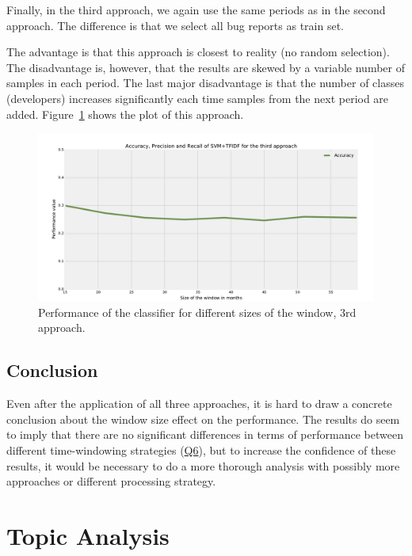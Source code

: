 Finally, in the third approach, we again use the same periods as in the second approach. The difference is that we select all bug reports as train set.

The advantage is that this approach is closest to reality (no random selection). The disadvantage is, however, that the results are skewed by a variable number of samples in each period. The last major disadvantage is that the number of classes (developers) increases significantly each time samples from the next period are added. Figure~\ref{fig:window.firefox.3a} shows the plot of this approach.

\begin{figure}[htbp]
    \centering
        \includegraphics[width=\textwidth]{./images/window_size/firefox_3a.pdf}
    \caption{Performance of the classifier for different sizes of the window, 3rd approach.}
    \label{fig:window.firefox.3a}
\end{figure}

\subsection{Conclusion}

Even after the application of all three approaches, it is hard to draw a concrete conclusion about the window size effect on the performance. The results do seem to imply that there are no significant differences in terms of performance between different time-windowing strategies (\hyperlink{question:6}{Q6}), but to increase the confidence of these results, it would be necessary to do a more thorough analysis with possibly more approaches or different processing strategy.

\section{Topic Analysis}

